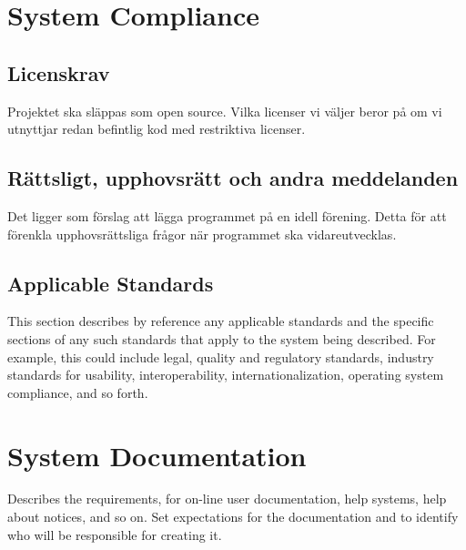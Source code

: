 \section{System Compliance}

\subsection{Licenskrav}
Projektet ska släppas som open source. Vilka licenser vi väljer beror på om vi utnyttjar redan befintlig kod med restriktiva licenser. 

\subsection{Rättsligt, upphovsrätt och andra meddelanden}
Det ligger som förslag att lägga programmet på en idell förening. Detta för att förenkla upphovsrättsliga frågor när programmet ska vidareutvecklas. 

\subsection{Applicable Standards}
This section describes by reference any applicable standards and the specific sections of any such standards that apply to the system being described. For example, this could include legal, quality and regulatory standards, industry standards for usability, interoperability, internationalization, operating system compliance, and so forth.

\section{System Documentation}
Describes the requirements, for on-line user documentation, help systems, help about notices, and so on. Set expectations for the documentation and to identify who will be responsible for creating it.


